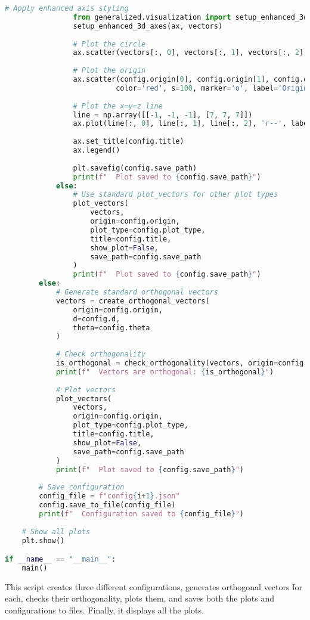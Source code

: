 \begin{lstlisting}[language=Python]
                # Apply enhanced axis styling
                from generalized.visualization import setup_enhanced_3d_axes
                setup_enhanced_3d_axes(ax, vectors)
                
                # Plot the circle
                ax.scatter(vectors[:, 0], vectors[:, 1], vectors[:, 2], label='Perfect Circle')
                
                # Plot the origin
                ax.scatter(config.origin[0], config.origin[1], config.origin[2], 
                          color='red', s=100, marker='o', label='Origin R_0')
                
                # Plot the x=y=z line
                line = np.array([[-1, -1, -1], [7, 7, 7]])
                ax.plot(line[:, 0], line[:, 1], line[:, 2], 'r--', label='x=y=z line')
                
                ax.set_title(config.title)
                ax.legend()
                
                plt.savefig(config.save_path)
                print(f"  Plot saved to {config.save_path}")
            else:
                # Use standard plot_vectors for other plot types
                plot_vectors(
                    vectors,
                    origin=config.origin,
                    plot_type=config.plot_type,
                    title=config.title,
                    show_plot=False,
                    save_path=config.save_path
                )
                print(f"  Plot saved to {config.save_path}")
        else:
            # Generate standard orthogonal vectors
            vectors = create_orthogonal_vectors(
                origin=config.origin,
                d=config.d,
                theta=config.theta
            )
            
            # Check orthogonality
            is_orthogonal = check_orthogonality(vectors, origin=config.origin)
            print(f"  Vectors are orthogonal: {is_orthogonal}")
            
            # Plot vectors
            plot_vectors(
                vectors,
                origin=config.origin,
                plot_type=config.plot_type,
                title=config.title,
                show_plot=False,
                save_path=config.save_path
            )
            print(f"  Plot saved to {config.save_path}")
        
        # Save configuration
        config_file = f"config{i+1}.json"
        config.save_to_file(config_file)
        print(f"  Configuration saved to {config_file}")
    
    # Show all plots
    plt.show()

if __name__ == "__main__":
    main()
\end{lstlisting}

This script creates three different configurations, generates orthogonal vectors for each, checks their orthogonality, plots them, and saves both the plots and configurations to files. Finally, it displays all the plots.
